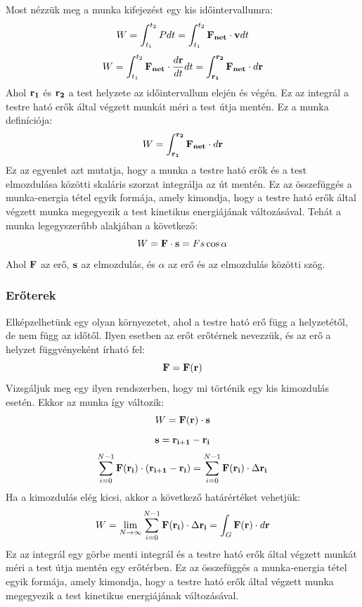 \documentclass[a4paper,12pt]{article}
\begin{document}
Most nézzük meg a munka kifejezést egy kis időintervallumra:
\begin{equation}
    W = \int_{t_1}^{t_2} P dt = \int_{t_1}^{t_2} \bold{F_{net}} \cdot \bold{v} dt
\end{equation}
\begin{equation}
    W = \int_{t_1}^{t_2} \bold{F_{net}} \cdot \frac{d\bold{r}}{dt} dt = \int_{\bold{r_1}}^{\bold{r_2}} \bold{F_{net}} \cdot d\bold{r}
\end{equation}
Ahol $\bold{r_1}$ és $\bold{r_2}$ a test helyzete az időintervallum elején és végén. Ez az integrál a testre ható erők által végzett munkát méri a test útja mentén. Ez a munka definíciója:
\begin{equation}
    W = \int_{\bold{r_1}}^{\bold{r_2}} \bold{F_{net}} \cdot d\bold{r}
\end{equation}
Ez az egyenlet azt mutatja, hogy a munka a testre ható erők és a test elmozdulása közötti skaláris szorzat integrálja az út mentén. Ez az összefüggés a munka-energia tétel egyik formája,
amely kimondja, hogy a testre ható erők által végzett munka megegyezik a test kinetikus energiájának változásával. Tehát a munka legegyszerűbb alakjában a következő:
\begin{equation}
    W = \bold{F} \cdot \bold{s} = F s \cos \alpha
\end{equation}
Ahol $\bold{F}$ az erő, $\bold{s}$ az elmozdulás, és $\alpha$ az erő és az elmozdulás közötti szög.
\subsubsection{Erőterek}
Elképzelhetünk egy olyan környezetet, ahol a testre ható erő függ a helyzetétől, de nem függ az időtől. Ilyen esetben az erőt erőtérnek nevezzük, és az erő a helyzet függvényeként írható fel:
\begin{equation}
    \bold{F} = \bold{F}(\bold{r})
\end{equation}
Vizsgáljuk meg egy ilyen rendszerben, hogy mi történik egy kis kimozdulás esetén. Ekkor az munka így változik:
\begin{equation}
    W = \bold{F}(\bold{r}) \cdot \bold{s}
\end{equation}
\begin{equation}
    \bold{s} = \bold{r_{i+1}} - \bold{r_i}
\end{equation}
\begin{equation}
    \sum_{i=0}^{N-1} \bold{F}(\bold{r_i}) \cdot (\bold{r_{i+1}} - \bold{r_i}) = \sum_{i=0}^{N-1} \bold{F}(\bold{r_i}) \cdot \Delta \bold{r_i}
\end{equation}
Ha a kimozdulás elég kicsi, akkor a következő határértéket vehetjük:
\begin{equation}
    W = \lim_{N \to \infty} \sum_{i=0}^{N-1} \bold{F}(\bold{r_i}) \cdot \Delta \bold{r_i} = \int_{G}^{} \bold{F}(\bold{r}) \cdot d\bold{r}
\end{equation}
Ez az integrál egy görbe menti integrál és a testre ható erők által végzett munkát méri a test útja mentén egy erőtérben. Ez az összefüggés a munka-energia tétel egyik formája, amely kimondja, hogy a testre ható erők által végzett munka megegyezik a test kinetikus energiájának
változásával.
\end{document}
